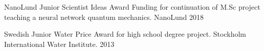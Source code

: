 


\begin{cvhonors}


\cvhonor
{NanoLund Junior Scientist Ideas Award} %
{Funding for continuation of M.Sc project teaching a neural network quantum mechanics.} %
{NanoLund} %
{2018} %


\cvhonor
{Swedish Junior Water Price} %
{Award for high school degree project.} %
{Stockholm International Water Institute.} %
{2013} %


\end{cvhonors}

